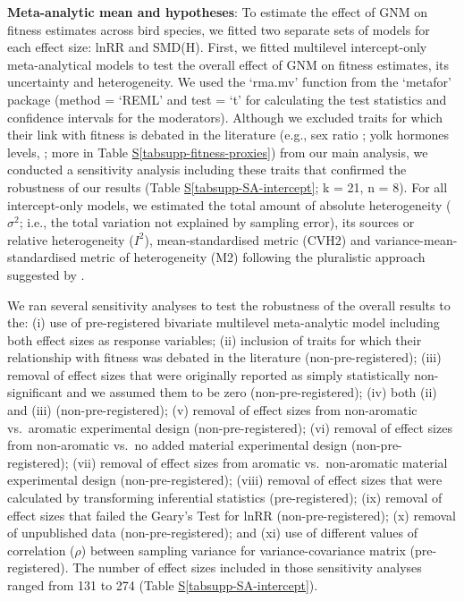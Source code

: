 \documentclass[
  number,
  review,
  onecolumn]{elsarticle}
\newcommand*\quartotabsuppref[1]{Table \hyperref[#1]{S\ref{#1}}}
\begin{document}
\textbf{Meta-analytic mean and hypotheses}: To estimate the effect of
GNM on fitness estimates across bird species, we fitted two separate
sets of models for each effect size: lnRR and SMD(H). First, we fitted
multilevel intercept-only meta-analytical models to test the overall
effect of GNM on fitness estimates, its uncertainty and heterogeneity.
We used the `rma.mv' function from the `metafor' package (method =
`REML' and test = `t' for calculating the test statistics and confidence
intervals for the moderators). Although we excluded traits for which
their link with fitness is debated in the literature (e.g., sex ratio
\citep{krackow2002}; yolk hormones levels, \citep{mentesana2025}; more
in \quartotabsuppref{tabsupp-fitness-proxies}) from our main analysis,
we conducted a sensitivity analysis including these traits that
confirmed the robustness of our results
(\quartotabsuppref{tabsupp-SA-intercept}; k = 21, n = 8). For all
intercept-only models, we estimated the total amount of absolute
heterogeneity (\(\sigma^2\); i.e., the total variation not explained by
sampling error), its sources or relative heterogeneity (\(I^2\)),
mean-standardised metric (CVH2) and variance-mean-standardised metric of
heterogeneity (M2) following the pluralistic approach suggested by
\citep{yang2025}.

We ran several sensitivity analyses to test the robustness of the
overall results to the: (i) use of pre-registered bivariate multilevel
meta-analytic model including both effect sizes as response variables;
(ii) inclusion of traits for which their relationship with fitness was
debated in the literature (non-pre-registered); (iii) removal of effect
sizes that were originally reported as simply statistically
non-significant and we assumed them to be zero (non-pre-registered);
(iv) both (ii) and (iii) (non-pre-registered); (v) removal of effect
sizes from non-aromatic vs.~aromatic experimental design
(non-pre-registered); (vi) removal of effect sizes from non-aromatic
vs.~no added material experimental design (non-pre-registered); (vii)
removal of effect sizes from aromatic vs.~non-aromatic material
experimental design (non-pre-registered); (viii) removal of effect sizes
that were calculated by transforming inferential statistics
(pre-registered); (ix) removal of effect sizes that failed the Geary's
Test for lnRR (non-pre-registered); (x) removal of unpublished data
(non-pre-registered); and (xi) use of different values of correlation
(\(\rho\)) between sampling variance for variance-covariance matrix
(pre-registered). The number of effect sizes included in those
sensitivity analyses ranged from 131 to 274
(\quartotabsuppref{tabsupp-SA-intercept}).
\end{document}
